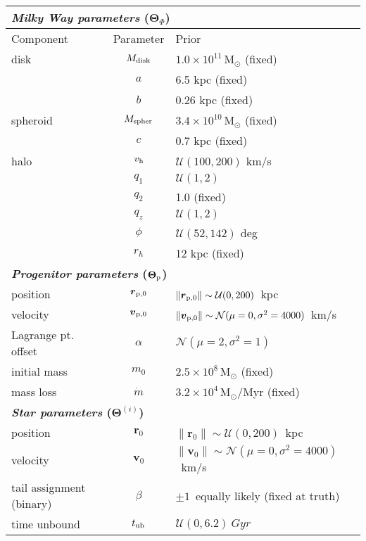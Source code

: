 \documentclass[letterpaper,12pt,preprint]{aastex}
\newcommand{\msun}{\mathrm{M}_\odot}
\newcommand{\bs}{\boldsymbol}
\newcommand{\sat}{{\rm p}}
\newcommand{\tub}{t_{\rm ub}}
\newcommand{\tint}{t_{\rm int}}
\newcommand{\vhalo}{v_{\rm h}}
\begin{document}
\begin{table}[h]
\begin{center}
	\begin{tabular}{l c l} \toprule
		\multicolumn{3}{l}{{\bf \emph{Milky Way parameters} ($\bs{\Theta}_\Phi$)}} \\
		\toprule
		Component & Parameter & Prior \\\toprule
		disk & $M_{\rm disk}$ & $1.0\times10^{11}\,\msun$ (fixed) \\ 
		& $a$ & 6.5 kpc (fixed)\\
		& $b$ & 0.26 kpc (fixed)\\
		\midrule
		spheroid & $M_{\rm spher}$ & $3.4\times10^{10}\,\msun$ (fixed)\\ 
		& $c$ & 0.7 kpc (fixed)\\
		\midrule
		halo & $\vhalo$ & $\mathcal{U}(100,200)$ km/s \\
		& $q_1$ & $\mathcal{U}(1,2)$\\
		& $q_2$ & 1.0 (fixed)\\
		& $q_z$ & $\mathcal{U}(1,2)$\\
		& $\phi$ & $\mathcal{U}(52,142)$ deg\\
		& $r_h$ & 12 kpc (fixed)\\
		\toprule
		\multicolumn{3}{l}{{\bf \emph{Progenitor parameters} ($\bs{\Theta}_\sat$)}} \\
		\toprule
		position & $\bs{r}_{\sat,0}$ & $\|\bs{r}_{\sat,0}\|\sim\mathcal{U}(0,200)$~kpc \\
		velocity & $\bs{v}_{\sat,0}$ & $\|\bs{v}_{\sat,0}\|\sim\mathcal{N}(\mu=0,\sigma^2=4000)$~km/s\\
		Lagrange pt. offset & $\alpha$ & $\mathcal{N}(\mu=2,\sigma^2=1)$\\
		initial mass & $m_0$ & $2.5\times10^8\,\msun$ (fixed)\\
		mass loss & $\dot{m}$ & $3.2\times10^4\,\msun$/Myr (fixed)\\
		\toprule
		\multicolumn{3}{l}{{\bf \emph{Star parameters} ($\bs{\Theta}^{(i)}$)}} \\
		\toprule
		position & $\bs{r}_0$ & $\|\bs{r}_0\|\sim\mathcal{U}(0,200)$~kpc \\
		velocity & $\bs{v}_0$ & $\|\bs{v}_0\|\sim\mathcal{N}(\mu=0,\sigma^2=4000)$~km/s\\
		tail assignment (binary) & $\beta$ & $\pm1$~equally likely (fixed at truth)\\ %
		time unbound & $\tub$ & $\mathcal{U}(0,6.2)~Gyr$\\ %

\end{tabular}
\end{center}
\end{table}
\end{document}
